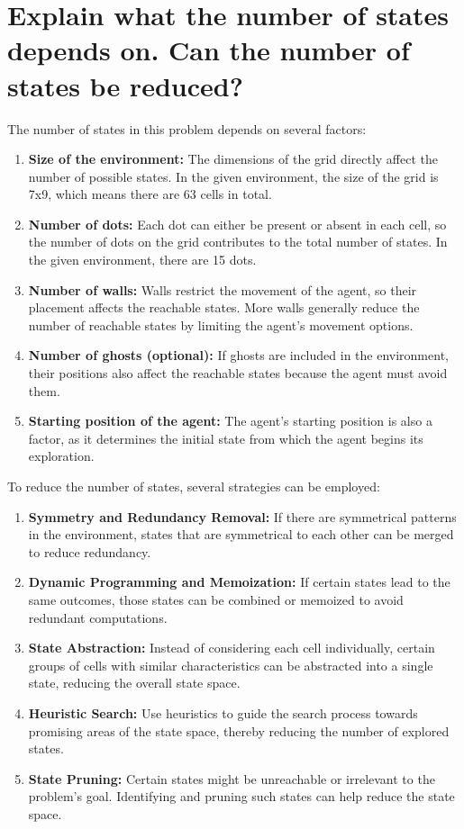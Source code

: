 \documentclass[12pt,onecolumn,a4paper]{article}
\begin{document}
\section{Explain what the number of states depends on. Can the number of states be reduced?}
The number of states in this problem depends on several factors:
\begin{enumerate}
	\item{\textbf{Size of the environment:}} The dimensions of the grid directly affect the number of possible states. In the given environment, the size of the grid is 7x9, which means there are 63 cells in total.
	\item{\textbf{Number of dots:}} Each dot can either be present or absent in each cell, so the number of dots on the grid contributes to the total number of states. In the given environment, there are 15 dots.
	\item{\textbf{Number of walls:}} Walls restrict the movement of the agent, so their placement affects the reachable states. More walls generally reduce the number of reachable states by limiting the agent's movement options.
	\item{\textbf{Number of ghosts (optional):}} If ghosts are included in the environment, their positions also affect the reachable states because the agent must avoid them.
	\item{\textbf{Starting position of the agent:}} The agent's starting position is also a factor, as it determines the initial state from which the agent begins its exploration.
\end{enumerate}
To reduce the number of states, several strategies can be employed:
\begin{enumerate}
\item{\textbf{Symmetry and Redundancy Removal:}} If there are symmetrical patterns in the environment, states that are symmetrical to each other can be merged to reduce redundancy.
\item{\textbf{Dynamic Programming and Memoization:}} If certain states lead to the same outcomes, those states can be combined or memoized to avoid redundant computations.
\item{\textbf{State Abstraction:}} Instead of considering each cell individually, certain groups of cells with similar characteristics can be abstracted into a single state, reducing the overall state space.
\item{\textbf{Heuristic Search:}} Use heuristics to guide the search process towards promising areas of the state space, thereby reducing the number of explored states.
\item{\textbf{State Pruning:}} Certain states might be unreachable or irrelevant to the problem's goal. Identifying and pruning such states can help reduce the state space.
\end{enumerate}
\end{document}
